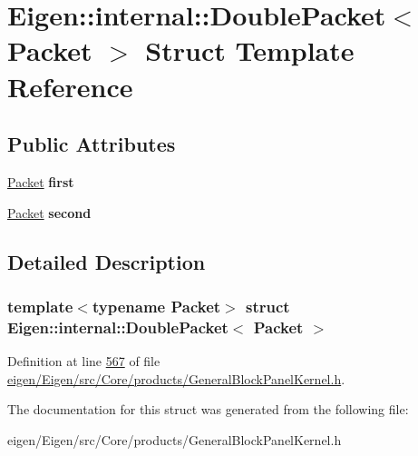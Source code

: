\hypertarget{struct_eigen_1_1internal_1_1_double_packet}{}\section{Eigen\+:\+:internal\+:\+:Double\+Packet$<$ Packet $>$ Struct Template Reference}
\label{struct_eigen_1_1internal_1_1_double_packet}
\subsection*{Public Attributes}
\begin{DoxyCompactItemize}
\item 
\mbox{\label{struct_eigen_1_1internal_1_1_double_packet_adc3064d8af45a76916e6467c31f1fdaa}} 
\hyperlink{union_eigen_1_1internal_1_1_packet}{Packet} {\bfseries first}
\item 
\mbox{\label{struct_eigen_1_1internal_1_1_double_packet_a65a886a57baa7bcc561d53ae58455245}} 
\hyperlink{union_eigen_1_1internal_1_1_packet}{Packet} {\bfseries second}
\end{DoxyCompactItemize}


\subsection{Detailed Description}
\subsubsection*{template$<$typename Packet$>$\newline
struct Eigen\+::internal\+::\+Double\+Packet$<$ Packet $>$}



Definition at line \hyperlink{eigen_2_eigen_2src_2_core_2products_2_general_block_panel_kernel_8h_source_l00567}{567} of file \hyperlink{eigen_2_eigen_2src_2_core_2products_2_general_block_panel_kernel_8h_source}{eigen/\+Eigen/src/\+Core/products/\+General\+Block\+Panel\+Kernel.\+h}.



The documentation for this struct was generated from the following file\+:\begin{DoxyCompactItemize}
\item 
eigen/\+Eigen/src/\+Core/products/\+General\+Block\+Panel\+Kernel.\+h\end{DoxyCompactItemize}
